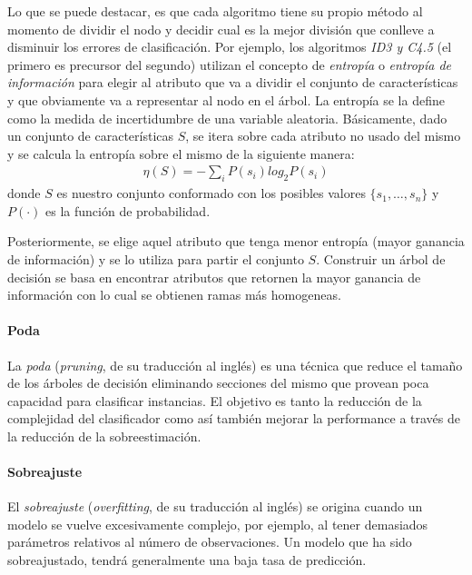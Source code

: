 	Lo que se puede destacar, es que cada algoritmo tiene su propio método al momento de dividir el nodo y decidir cual es la mejor división que conlleve a disminuir los errores de clasificación. Por ejemplo, los algoritmos \textit{ID3 y C4.5} \cite{QuinlanID3, QuinlanC45} (el primero es precursor del segundo)  utilizan el concepto de \textit{entropía} o \textit{entropía de información} para elegir al atributo que va a dividir el conjunto de características y que obviamente va a representar al nodo en el árbol. La entropía se la define como la medida de incertidumbre de una variable aleatoria.  Básicamente, dado un conjunto de características $S$, se itera sobre cada atributo no usado del mismo y se calcula la entropía sobre el mismo de la siguiente manera:
	\begin{align}
		\eta(S) = -\sum_i P(s_i)log_{2}P(s_i)
	\end{align}
	donde $S$ es nuestro conjunto conformado con los posibles valores $\{ s_1,\dots, s_n \}$ y $P( \cdot )$ es la función de probabilidad.
	
	Posteriormente, se elige aquel atributo que tenga menor entropía (mayor ganancia de información) y se lo utiliza para partir el conjunto $S$. Construir un árbol de decisión se basa en encontrar atributos que retornen la mayor ganancia de información con lo cual se obtienen ramas más homogeneas.
	
	\paragraph{Poda}
	
		La \textit{poda} (\textit{pruning}, de su traducción al inglés) es una técnica que reduce el tamaño de los árboles de decisión eliminando secciones del mismo que provean poca capacidad para clasificar instancias. El objetivo es tanto la reducción de la complejidad del clasificador como así también mejorar la performance a través de la reducción de la sobreestimación.
	
	\paragraph{Sobreajuste}
	
		El \textit{sobreajuste} (\textit{overfitting}, de su traducción al inglés) se origina cuando un modelo se vuelve excesivamente complejo, por ejemplo, al tener demasiados parámetros relativos al número de observaciones. Un modelo que ha sido sobreajustado, tendrá generalmente una baja tasa de predicción.


